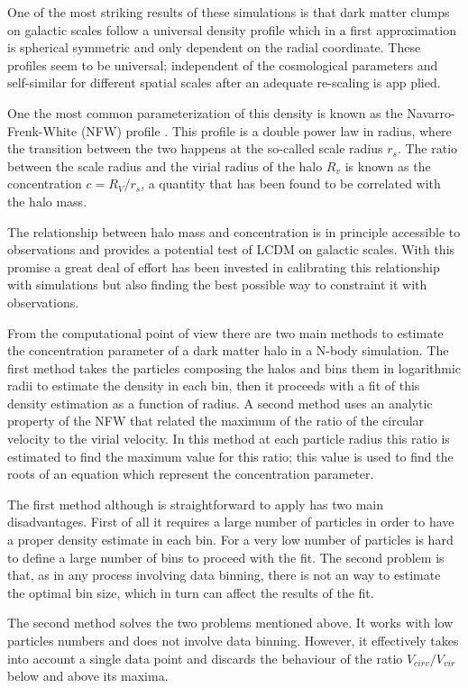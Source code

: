 \documentclass[useAMS,usenatbib]{mn2e}
\begin{document}
One of the most striking results of these simulations is that dark
matter clumps on galactic scales follow a universal density profile
which in a first approximation is spherical symmetric and only
dependent on the radial coordinate. These profiles seem to be
universal; independent of the cosmological parameters and self-similar
for different spatial scales after an adequate re-scaling is
app plied.

One the most common parameterization of this density is known as the
Navarro-Frenk-White (NFW) profile \citep{NFW}. This profile is a
double power law in radius, where the transition between the two
happens at the so-called scale radius $r_s$. The ratio between the
scale radius and the virial radius of the halo $R_v$ is known as the
concentration $c=R_V/r_s$, a quantity that has been found to be
correlated with the halo mass.

The relationship between halo mass and concentration is in principle
accessible to observations and provides a potential test of LCDM on
galactic scales. With this promise a great deal of effort has been
invested in calibrating this relationship with simulations but also
finding the best possible way to constraint it with observations.

From the computational point of view there are two main methods to
estimate the concentration parameter of a dark matter halo in a N-body
simulation. The first method takes the particles composing the halos
and bins them in logarithmic radii to estimate the density in each
bin, then it proceeds with a fit of this density estimation as a
function of radius. A second method uses an analytic property of the
NFW that related the maximum of the ratio of the circular velocity to
the virial velocity. In this method at each particle radius this ratio
is estimated to find the maximum value for this ratio; this value is
used to find the roots of an equation which represent the
concentration parameter.

The first method although is straightforward to apply has two main
disadvantages. First of all it requires a large number of particles in
order to have a proper density estimate in each bin. For a very low
number of particles is hard to define a large number of bins to
proceed with the fit. The second problem is that, as in any process
involving data binning, there is not an way to estimate the optimal
bin size, which in turn can affect the results of the fit.

The second method solves the two problems mentioned above. It works
with low particles numbers and does not involve data binning. However,
it effectively takes into account a single data point and discards the
behaviour of the ratio $V_{cirv}/V_{vir}$ below and above its
maxima.
\end{document}
